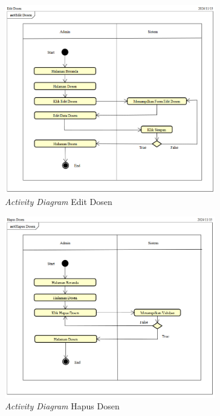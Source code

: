 \begin{figure}
	\centering
	\includegraphics[width=0.82\textwidth]{konten/gambar/activity-diagram/edit-dosen.png}
	\caption{\textit{Activity Diagram} Edit Dosen}
	\label{activity-diagram-edit-dosen}
\end{figure}

\begin{figure}
	\centering
	\includegraphics[width=0.82\textwidth]{konten/gambar/activity-diagram/hapus-dosen.png}
	\caption{\textit{Activity Diagram} Hapus Dosen}
	\label{activity-diagram-hapus-dosen}
\end{figure}

